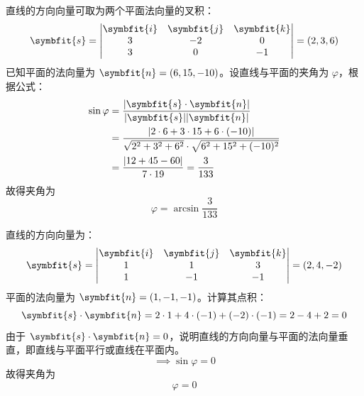 \begin{solution}

    直线的方向向量可取为两个平面法向量的叉积：
    \begin{equation}
        \symbfit{s} = \begin{vmatrix} \symbfit{i} & \symbfit{j} & \symbfit{k} \\ 3 & -2 & 0 \\ 3 & 0 & -1 \end{vmatrix} = (2, 3, 6)
    \end{equation}
    已知平面的法向量为 $\symbfit{n} = (6, 15, -10)$。设直线与平面的夹角为 $\varphi$，根据公式：
    \begin{equation}
        \begin{aligned}
            \sin \varphi & = \frac{|\symbfit{s} \cdot \symbfit{n}|}{|\symbfit{s}| |\symbfit{n}|}                                       \\
                         & = \frac{|2 \cdot 6 + 3 \cdot 15 + 6 \cdot (-10)|}{\sqrt{2^2 + 3^2 + 6^2} \cdot \sqrt{6^2 + 15^2 + (-10)^2}} \\
                         & = \frac{|12 + 45 - 60|}{7 \cdot 19} = \frac{3}{133}
        \end{aligned}
    \end{equation}
    故得夹角为
    \begin{equation}
        \boxed{\varphi = \arcsin \frac{3}{133}}
    \end{equation}


    直线的方向向量为：
    \begin{equation}
        \symbfit{s} = \begin{vmatrix} \symbfit{i} & \symbfit{j} & \symbfit{k} \\ 1 & 1 & 3 \\ 1 & -1 & -1 \end{vmatrix} = (2, 4, -2)
    \end{equation}
    平面的法向量为 $\symbfit{n} = (1, -1, -1)$。计算其点积：
    \begin{equation}
        \symbfit{s} \cdot \symbfit{n} = 2 \cdot 1 + 4 \cdot (-1) + (-2) \cdot (-1) = 2 - 4 + 2 = 0
    \end{equation}
    由于 $\symbfit{s} \cdot \symbfit{n} = 0$，说明直线的方向向量与平面的法向量垂直，即直线与平面平行或直线在平面内。
    \begin{equation}
        \implies \sin \varphi = 0
    \end{equation}
    故得夹角为
    \begin{equation}
        \boxed{\varphi = 0}
    \end{equation}
\end{solution}


